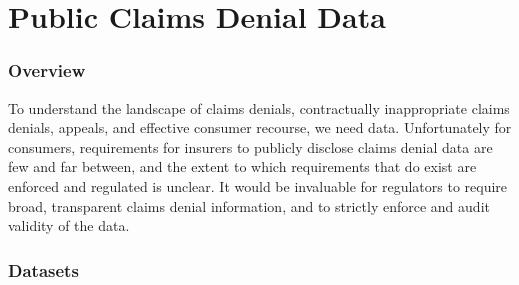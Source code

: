 \documentclass[12pt, a4paper,twoside,parskip=full]{report}
\theoremstyle{plain} %
\theoremstyle{definition} %
\theoremstyle{remark} %
\numberwithin{equation}{chapter}
\begin{document}
		\chapter{Public Claims Denial Data}\label{publicdata}
				
		\subsection{Overview}\label{publicdata:overview}
		To understand the landscape of claims denials, contractually inappropriate claims denials, appeals, and effective consumer recourse, we need data. Unfortunately for consumers, requirements for insurers to publicly disclose claims denial data are few and far between, and the extent to which requirements that do exist are enforced and regulated is unclear. It would be invaluable for regulators to require broad, transparent claims denial information, and to strictly enforce and audit validity of the data.
		\subsection{Datasets}\label{publicdata:datasets}
		
\end{document}
